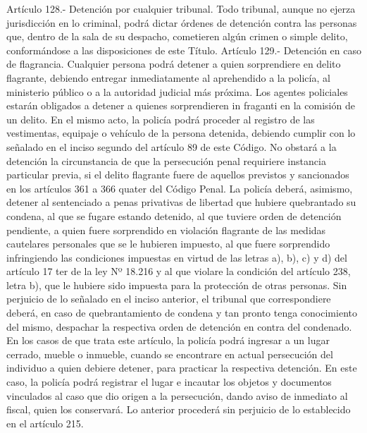    Artículo 128.- Detención por cualquier tribunal. Todo tribunal, aunque no ejerza jurisdicción en lo criminal, podrá dictar órdenes de detención contra las personas que, dentro de la sala de su despacho, cometieren algún crimen o simple delito, conformándose a las disposiciones de este Título.
    Artículo 129.- Detención en caso de flagrancia. Cualquier persona podrá detener a quien sorprendiere en delito flagrante, debiendo entregar inmediatamente al aprehendido a la policía, al ministerio público o a la autoridad judicial más próxima.
    Los agentes policiales estarán obligados a detener a quienes sorprendieren in fraganti en la comisión de un delito. En el mismo acto, la policía podrá proceder al registro de las vestimentas, equipaje o vehículo de la persona detenida, debiendo cumplir con lo señalado en el inciso segundo del artículo 89 de este Código.
    No obstará a la detención la circunstancia de que la persecución penal requiriere instancia particular previa, si el delito flagrante fuere de aquellos previstos y sancionados en los artículos 361 a 366 quater del Código Penal.
    La policía deberá, asimismo, detener al sentenciado a penas privativas de libertad que hubiere quebrantado su condena, al que se fugare estando detenido, al que tuviere orden de detención pendiente, a quien fuere sorprendido en violación flagrante de las medidas cautelares personales que se le hubieren impuesto, al que fuere sorprendido infringiendo las condiciones impuestas en virtud de las letras a), b), c) y d) del artículo 17 ter de la ley Nº 18.216 y al que violare la condición del artículo 238, letra b), que le hubiere sido impuesta para la protección de otras personas.
    Sin perjuicio de lo señalado en el inciso anterior, el tribunal que correspondiere deberá, en caso de quebrantamiento de condena y tan pronto tenga conocimiento del mismo, despachar la respectiva orden de detención en contra del condenado.
    En los casos de que trata este artículo, la policía podrá ingresar a un lugar cerrado, mueble o inmueble, cuando se encontrare en actual persecución del individuo a quien debiere detener, para practicar la respectiva detención. En este caso, la policía podrá registrar el lugar e incautar los objetos y documentos vinculados al caso que dio origen a la persecución, dando aviso de inmediato al fiscal, quien los conservará. Lo anterior procederá sin perjuicio de lo establecido en el artículo 215.



